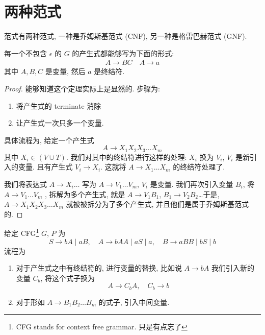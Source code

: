 \documentclass[../main_part1.tex]{subfiles}
\begin{document}
\section{两种范式}
\label{sec:两种范式}
范式有两种范式, 一种是乔姆斯基范式 (CNF), 另一种是格雷巴赫范式 (GNF). 

\begin{definition}
\label{def:CNF}
每一个不包含 \(\epsilon\) 的 \(G\) 的产生式都能够写为下面的形式: 
\[
	\begin{aligned}
	A  \to BC  \quad A \to a 
	\end{aligned}
\]
其中 \(A,  B , C \) 是变量, 然后 \(a\) 是终结符. 
\end{definition}

\begin{proof}
能够知道这个定理实际上是显然的. 步骤为: 
\begin{enumerate}
\item 将产生式的 terminate 消除
\item 让产生式一次只多一个变量. 
\end{enumerate}
具体流程为, 给定一个产生式
\[
A \to X_1 X_2 X_3 \dots X_m 
\]
	其中 \(X _{i} \in (V \cup T)\). 我们对其中的终结符进行这样的处理: \(X_{i}\) 换为 \(V_{i}\), \(V_{i}\) 是新引入的变量. 
	且有产生式 \(V_{i} \to X _{i}\). 这就将 \(A \to X_1 \dots X_{m}\) 的终结符处理了. 
	
	我们将表达式 \(A \to X _{i}\dots\) 写为 \(A \to V_1 \dots V_{m}\), \(V_{i}\) 是变量. 我们再次引入变量 \(B _{i}\), 将 \(A \to V_1\dots V_{m}\) , 拆解为多个产生式, 就是 \(A \to V_1 B_1\), \(B_1 \to V_2 B_2\)\dots 于是, \(A \to X_1 X_2 X_3 \dots X_{m}\) 就被被拆分为了多个产生式, 并且他们是属于乔姆斯基范式的. 
\end{proof}

\begin{exam}
给定 CFG\footnote{CFG stands for context free grammar. 只是有点忘了} \(G\), \(P\) 为 
\[
S \to b A \mid a B , \quad A \to b A  A \mid a S \mid a, \quad B \to a BB \mid bS \mid b 
\]
流程为
\begin{enumerate}
\item 对于产生式之中有终结符的, 进行变量的替换, 比如说 \(A \to b A\) 我们引入新的变量 \(C_{b}\), 将这个式子换为 
	\[
	A \to C_{b} A , \quad  C_{b} \to b
	\]
\item 对于形如 \(A\to  B_1 B_2 \dots B _{m}\) 的式子, 引入中间变量. 
\end{enumerate}
\end{exam}
\end{document}
